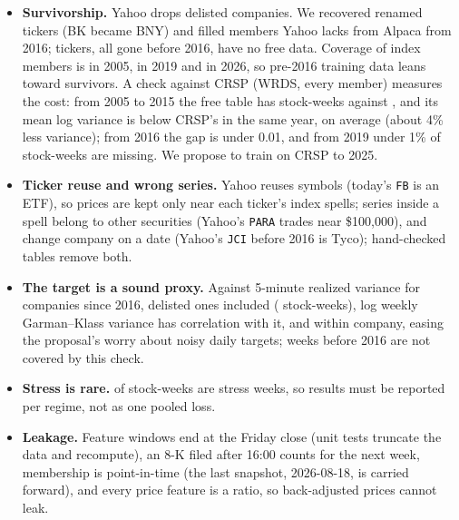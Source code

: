 \documentclass[11pt]{article}
\begin{document}
\begin{itemize}
  \item \textbf{Survivorship.} Yahoo drops delisted companies. We recovered \nRenames{} renamed tickers
        (BK became BNY) and filled members Yahoo lacks from Alpaca from 2016; \nNoData{} tickers, all gone
        before 2016, have no free data. Coverage of index members is \covEarly{} in 2005, \covTest{} in
        2019 and \covEnd{} in 2026, so pre-2016 training data leans toward survivors. A check against
        CRSP (WRDS, every member) measures the cost: from 2005 to 2015 the free table has
        \crspWeeksFree{} stock-weeks against \crspWeeksCrsp{}, and its mean log variance is \crspGap{}
        below CRSP's in the same year, on average (about 4\% less variance); from 2016 the gap is
        under 0.01, and from 2019 under 1\% of stock-weeks are missing. We propose to train on CRSP
        to 2025.
  \item \textbf{Ticker reuse and wrong series.} Yahoo reuses symbols (today's \texttt{FB} is an ETF), so
        prices are kept only near each ticker's index spells; \nWrong{} series inside a spell belong to
        other securities (Yahoo's \texttt{PARA} trades near \$100{,}000), and \nBreaks{} change company on a date
        (Yahoo's \texttt{JCI} before 2016 is Tyco); hand-checked tables remove both.
  \item \textbf{The target is a sound proxy.} Against 5-minute realized variance for \rvCompanies{} companies
        since 2016, delisted ones included (\rvN{} stock-weeks), log weekly Garman--Klass variance has
        correlation \rvCorr{} with it, and \rvCorrWithin{} within company, easing the proposal's worry
        about noisy daily targets; weeks before 2016 are not covered by this check.
  \item \textbf{Stress is rare.} \stressShare{} of stock-weeks are stress weeks, so results must be
        reported per regime, not as one pooled loss.
  \item \textbf{Leakage.} Feature windows end at the Friday close (unit tests truncate the data and
        recompute), an 8-K filed after 16:00 counts for the next week, membership is point-in-time (the last
        snapshot, 2026-08-18, is carried forward), and
        every price feature is a ratio, so back-adjusted prices cannot leak.
\end{itemize}

\end{document}
